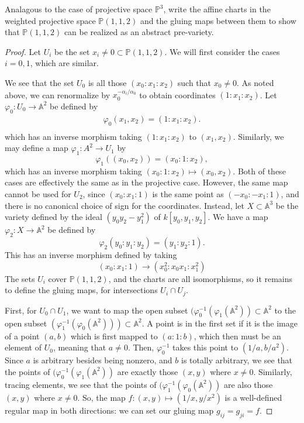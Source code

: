 \documentclass[12pt]{article}
\renewcommand{\P}{\mathbb{P}}
\theoremstyle{definition}
\newenvironment{problem}[2][Problem]{\begin{trivlist}
\item[\hskip \labelsep {\bfseries #1}\hskip \labelsep {\bfseries #2.}]}{\end{trivlist}}
\begin{document}
\begin{problem}{3}
	Analagous to the case of projective space $\mathbb P^3$, write the affine charts in the weighted projective space $\mathbb P(1,1,2)$ and the gluing maps between them to show that $\mathbb P(1,1,2)$ can be realized as an abstract pre-variety.
	 \begin{proof}
		 Let $U_i$ be the set $x_i \neq 0 \subset \P(1,1,2)$. We will first consider the cases $i = 0, 1$, which are similar.
		 \par We see that the set $U_0$ is all those $(x_0:x_1:x_2)$ such that $x_0 \neq 0$. As noted above, we can renormalize by $x_0^{-\alpha_i/\alpha_0}$ to obtain coordinates $(1:x_1:x_2)$. Let $\varphi_0: U_0 \to \mathbb A^2$  be defined by
		 \begin{align*}
			 \varphi_0(x_1, x_2) = (1:x_1:x_2).\\
		 \end{align*}
		 which has an inverse morphism taking $(1:x_1:x_2)$ to $(x_1, x_2)$.
	 Similarly, we may define a map $\varphi_1: A^2 \to U_1$ by
	 \[\varphi_{1}( (x_0,x_2)) = (x_0: 1: x_2),\]
	 which has an inverse morphism taking $(x_0:1:x_2) \mapsto (x_0,x_2)$.
		 Both of these cases are effectively the same as in the projective case. However, the same map cannot be used for $U_2$, since $(x_0:x_1:1)$ is the same point as $(-x_0:-x_1:1)$, and there is no canonical choice of sign for the coordinates.
		 Instead, let $X \subset \mathbb A^3$ be the variety defined by the ideal $(y_0y_2 - y_1^2)$ of $k[y_0, y_1, y_2]$. We have a map $\varphi_2: X \to \mathbb A^2$ be defined by 
		 \[ \varphi_2(y_0:y_1:y_2) = (y_1:y_2:1).\]
		 This has an inverse morphism defined by taking 
	 \[(x_0:x_1:1) \to (x_0^2:x_0x_1:x_1^2)\]
	 The sets $U_i$ cover $\P(1,1,2)$, and the charts are all isomorphisms, so it remains to define the gluing maps, for intersections $U_i \cap U_j$.
	 \par First, for $U_0 \cap U_1$, we want to map the open subset $(\varphi_0^{-1}(\varphi_1(\mathbb A^2)) \subset \mathbb A^2$ to the open subset $(\varphi_1^{-1}(\varphi_0(\mathbb A^2))) \subset \mathbb A^2$. A point is in the first set if it is the image of a point $(a,b)$ which is first mapped to $(a:1:b)$, which then must be an element of $U_0$, meaning that $a \neq 0$. Then, $\varphi_0^{-1}$ takes this point to $(1/a, b/a^2)$. Since $a$ is arbitrary besides being nonzero, and $b$ is totally arbitrary, we see that the points of $(\varphi_0^{-1}(\varphi_1(\mathbb A^2))$ are exactly those $(x,y)$ where $x \neq 0$. Similarly, tracing elements, we see that the points of $(\varphi_1^{-1}(\varphi_0(\mathbb A^2))$ are also those $(x,y)$ where $x \neq 0$. So, the map $f: (x, y) \mapsto (1/x, y/x^2)$ is a well-defined regular map in both directions: we can set our gluing map $g_{ij} = g_{ji} = f $.

\end{proof}
\end{problem}
\end{document}
